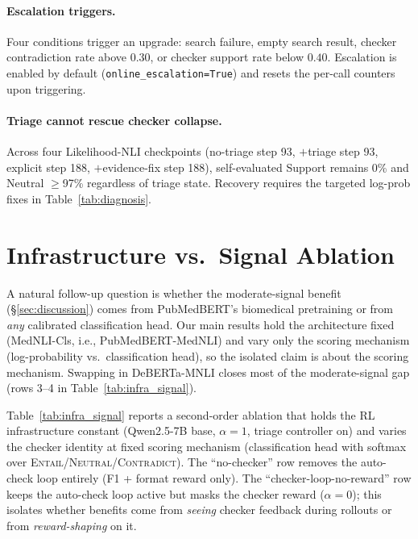 \documentclass[11pt]{article}
\begin{document}
\paragraph{Escalation triggers.}
Four conditions trigger an upgrade: search failure,
empty search result, checker contradiction rate above
$0.30$, or checker support rate below $0.40$.
Escalation is enabled by default (\texttt{online\_escalation=True})
and resets the per-call counters upon triggering.

\paragraph{Triage cannot rescue checker collapse.}
Across four Likelihood-NLI checkpoints
(no-triage step 93, $+$triage step 93,
explicit step 188, $+$evidence-fix step 188),
self-evaluated Support remains 0\% and Neutral
$\geq$97\% regardless of triage state. Recovery
requires the targeted log-prob fixes in
Table~\ref{tab:diagnosis}.




\section{Infrastructure vs.\ Signal Ablation}
\label{app:infra_signal}


A natural follow-up question is whether the moderate-signal benefit (\S\ref{sec:discussion}) comes from PubMedBERT's biomedical pretraining or from \emph{any} calibrated classification head. Our main results hold the architecture fixed (MedNLI-Cls, i.e., PubMedBERT-MedNLI) and vary only the scoring mechanism (log-probability vs.\ classification head), so the isolated claim is about the scoring mechanism.  Swapping in DeBERTa-MNLI closes most of the moderate-signal gap (rows 3--4 in Table~\ref{tab:infra_signal}).

Table~\ref{tab:infra_signal} reports a 
second-order ablation that holds the RL infrastructure
constant (Qwen2.5-7B base, $\alpha\!=\!1$, triage
controller on) and varies the checker identity at
fixed scoring mechanism (classification head with
softmax over
\textsc{Entail}/\textsc{Neutral}/\textsc{Contradict}).
The ``no-checker'' row removes the auto-check loop
entirely (F1 + format reward only). The
``checker-loop-no-reward'' row keeps the auto-check
loop active but masks the checker reward
($\alpha\!=\!0$); this isolates whether benefits come
from \emph{seeing} checker feedback during rollouts
or from \emph{reward-shaping} on it.
\end{document}
